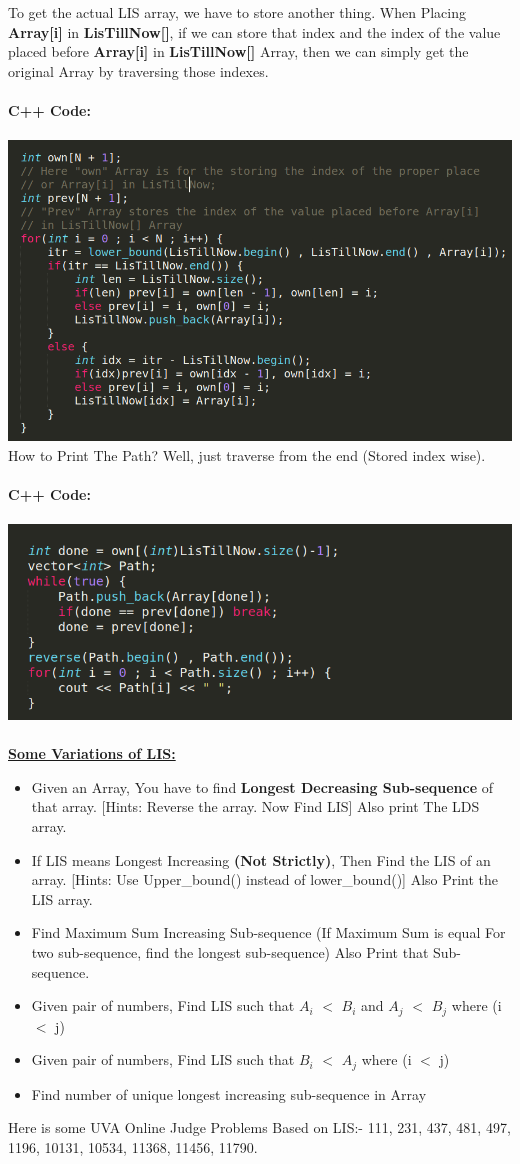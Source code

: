 \documentclass[12pt]{article}
\begin{document}
To get the actual LIS array, we have to store another thing. When Placing \textbf{Array[i]} in \textbf{LisTillNow[]}, if we can store that index and the index of the value placed before \textbf{Array[i]} in \textbf{LisTillNow[]} Array, then we can simply get the original Array by traversing those indexes. \\ \\
\textbf{C++ Code:} \\ \\
\includegraphics[width=\textwidth]{LOGN_print}
\newpage
How to Print The Path? Well, just traverse from the end (Stored index wise). \\ \\
\textbf{C++ Code:} \\ \\
\includegraphics[width=\textwidth]{LOGN_PRINT_PATH}
\\ \\ 
\underline{\Large{\textbf{Some Variations of LIS:}}}
\begin{itemize}
\item Given an Array, You have to find \textbf{Longest Decreasing Sub-sequence} of that array. [Hints: Reverse the array. Now Find LIS] Also print The LDS array.
\item If LIS means Longest Increasing \textbf{(Not Strictly)}, Then Find the LIS of an array. [Hints: Use Upper\_bound() instead of lower\_bound()] Also Print the LIS array.
\item Find Maximum Sum Increasing Sub-sequence (If Maximum Sum is equal For two sub-sequence, find the longest sub-sequence) Also Print that Sub-sequence.
\item Given pair of numbers, Find LIS such that $A_i$ $<$ $ B_i $ and $A_j$ $<$ $ B_j $ where (i $<$ j)
\item Given pair of numbers, Find LIS such that $B_i$ $<$ $ A_j $ where (i $<$ j)
\item Find number of unique longest increasing sub-sequence in Array
\end{itemize}
Here is some UVA Online Judge Problems Based on LIS:- 111, 231, 437, 481, 497, 1196, 10131, 10534, 11368, 11456, 11790.
\end{document}
